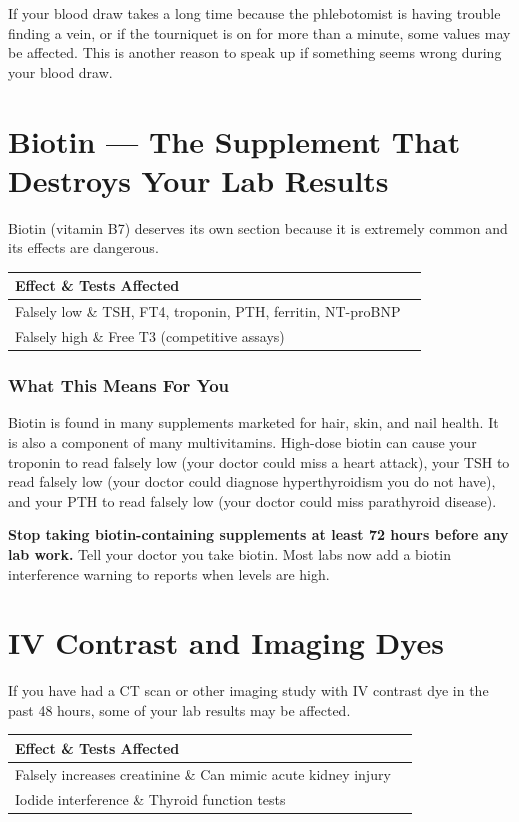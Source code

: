 If your blood draw takes a long time because the phlebotomist is having trouble finding a vein, or if the tourniquet is on for more than a minute, some values may be affected. This is another reason to speak up if something seems wrong during your blood draw.

\clearpage
\section{Biotin --- The Supplement That Destroys Your Lab Results}

Biotin (vitamin B7) deserves its own section because it is extremely common and its effects are dangerous.

\begin{longtable}{@{}ll@{}}
\toprule
\textbf{Effect} \& \textbf{Tests Affected} \\
\midrule
Falsely low \& TSH, FT4, troponin, PTH, ferritin, NT-proBNP \\
Falsely high \& Free T3 (competitive assays) \\
\bottomrule
\end{longtable}

\subsubsection{What This Means For You}

Biotin is found in many supplements marketed for hair, skin, and nail health. It is also a component of many multivitamins. High-dose biotin can cause your troponin to read falsely low (your doctor could miss a heart attack), your TSH to read falsely low (your doctor could diagnose hyperthyroidism you do not have), and your PTH to read falsely low (your doctor could miss parathyroid disease).

\textbf{Stop taking biotin-containing supplements at least 72 hours before any lab work.} Tell your doctor you take biotin. Most labs now add a biotin interference warning to reports when levels are high.

\clearpage
\section{IV Contrast and Imaging Dyes}

If you have had a CT scan or other imaging study with IV contrast dye in the past 48 hours, some of your lab results may be affected.

\begin{longtable}{@{}ll@{}}
\toprule
\textbf{Effect} \& \textbf{Tests Affected} \\
\midrule
Falsely increases creatinine \& Can mimic acute kidney injury \\
Iodide interference \& Thyroid function tests \\
\bottomrule
\end{longtable}

